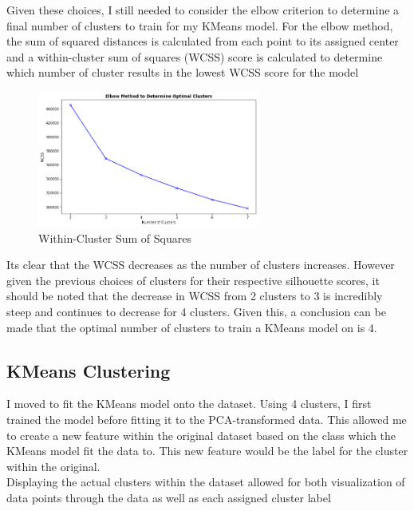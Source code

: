 \documentclass[12pt]{article}
\begin{document}
\noindent
Given these choices, I still needed to consider the elbow criterion to determine a final number of clusters to train for my KMeans model. For the elbow method, the sum of squared distances is calculated from each point to its assigned center and a within-cluster sum of squares (WCSS) score is calculated to determine which number of cluster results in the lowest WCSS score for the  model


\begin{figure}[htbp]
  \centering
  \vspace{-0.075cm}
  \includegraphics[width=0.65\textwidth]{kmeans_elbow.png}
  \caption{Within-Cluster Sum of Squares}
  \label{KMeans Elbow Criterion WCSS}
\end{figure}

\newpage \noindent
Its clear that the WCSS decreases as the number of clusters increases. However given the previous choices of clusters for their respective silhouette scores, it should be noted that the decrease in WCSS from 2 clusters to 3 is incredibly steep and continues to decrease for 4 clusters. Given this, a conclusion can be made that the optimal number of clusters to train a KMeans model on is 4.


\subsection*{\textbf{KMeans Clustering}}
I moved to fit the KMeans model onto the dataset. Using 4 clusters, I first trained the model before fitting it to the PCA-transformed data. This allowed me to create a new feature within the original dataset based on the class which the KMeans model fit the data to. This new feature would be the label for the cluster within the original. \\

\noindent
Displaying the actual clusters within the dataset allowed for both visualization of data points through the data as well as each assigned cluster label
\end{document}
